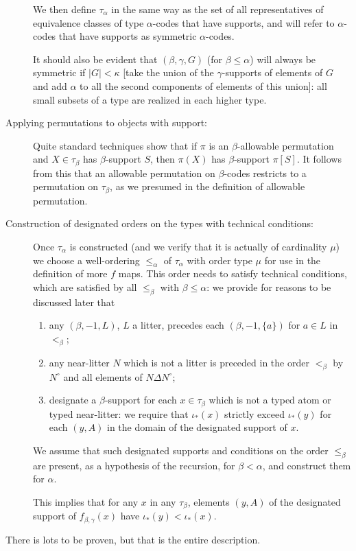 \documentclass[112pt]{article}
\begin{document}
\begin{description}
We then define $\tau_\alpha$ in the same way as the set of all representatives of equivalence classes of type $\alpha$-codes that have supports, and will refer to $\alpha$-codes that have supports as symmetric $\alpha$-codes.

It should also be evident that $(\beta,\gamma,G)$ (for $\beta\leq \alpha$) will always be symmetric if $|G|<\kappa$ [take the union of the $\gamma$-supports of elements of $G$ and add $\alpha$ to all the second components of elements of this union]:  all small subsets of a type are realized in each higher type.

\item[Applying permutations to objects with support:]  Quite standard techniques show that if $\pi$ is an $\beta$-allowable permutation and $X \in \tau_\beta$ has $\beta$-support $S$, then $\pi(X)$ has $\beta$-support $\pi[S]$.   It follows from this that an allowable permutation on $\beta$-codes restricts to a permutation on $\tau_\beta$, as we presumed in the definition of allowable permutation.



\item[Construction of designated orders on the types with technical conditions:]  Once $\tau_\alpha$ is constructed (and we verify that it is actually of cardinality $\mu$) we choose a well-ordering $\leq_\alpha$ of $\tau_\alpha$ with order type $\mu$ for use in the definition of more $f$ maps.  This order needs to satisfy technical conditions, which are satisfied by all $\leq_\beta$ with $\beta\leq\alpha$:  we provide for reasons to be discussed later that
\begin{enumerate}
\item any $(\beta,-1,L)$, $L$ a litter, precedes each $(\beta,-1,\{a\})$ for $a \in L$ in $<_\beta$;  \item any near-litter $N$ which is not a litter is preceded in the order $<_\beta$ by $N^\circ$  and all elements of $N\Delta N^\circ$; \item designate a $\beta$-support for each $x \in \tau_\beta$ which is not a typed atom or typed near-litter:  we require that $\iota_*(x)$ strictly exceed $\iota_*(y)$ for each $(y,A)$ in the domain of the designated support of $x$.\end{enumerate}  We assume that such designated supports and conditions on the order $\leq_\beta$ are present, as a hypothesis of the recursion, for $\beta<\alpha$, and construct them for $\alpha$.

This implies that for any $x$ in any $\tau_\beta$, elements $(y,A)$ of the designated support of $f_{\beta,\gamma}(x)$  have $\iota_*(y) < \iota_*(x)$.
\end{description}
There is lots to be proven, but that is the entire description.
\end{document}
